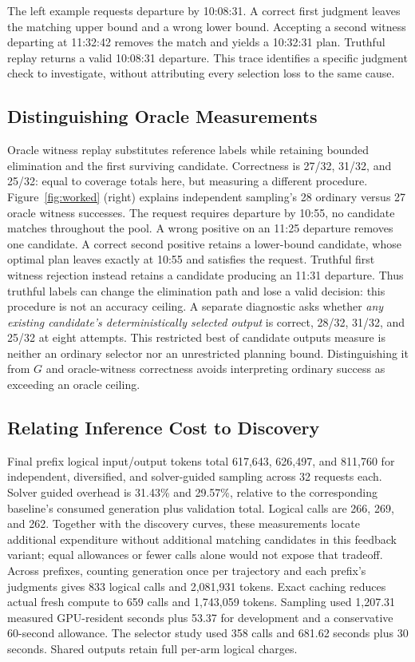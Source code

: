 \documentclass[a4paper,twoside]{article}
\begin{document}
The left example requests departure by 10:08:31. A correct first judgment leaves the matching upper bound and a wrong lower bound. Accepting a second witness departing at 11:32:42 removes the match and yields a 10:32:31 plan. Truthful replay returns a valid 10:08:31 departure. This trace identifies a specific judgment check to investigate, without attributing every selection loss to the same cause.

\subsection{Distinguishing Oracle Measurements}

Oracle witness replay substitutes reference labels while retaining bounded elimination and the first surviving candidate. Correctness is 27/32, 31/32, and 25/32: equal to coverage totals here, but measuring a different procedure.
Figure~\ref{fig:worked} (right) explains independent sampling's 28 ordinary versus 27 oracle witness successes. The request requires departure by 10:55, no candidate matches throughout the pool. A wrong positive on an 11:25 departure removes one candidate. A correct second positive retains a lower-bound candidate, whose optimal plan leaves exactly at 10:55 and satisfies the request. Truthful first witness rejection instead retains a candidate producing an 11:31 departure. Thus truthful labels can change the elimination path and lose a valid decision: this procedure is not an accuracy ceiling.
A separate diagnostic asks whether \emph{any existing candidate's deterministically selected output} is correct,  28/32, 31/32, and 25/32 at eight attempts. This restricted best of candidate outputs measure is neither an ordinary selector nor an unrestricted planning bound. Distinguishing it from $G$ and oracle-witness correctness avoids interpreting ordinary success as exceeding an oracle ceiling.

\subsection{Relating Inference Cost to Discovery}

Final prefix logical input/output tokens total 617,643, 626,497, and 811,760 for independent, diversified, and solver-guided sampling across 32 requests each. Solver guided overhead is 31.43\% and 29.57\%, relative to the corresponding baseline's consumed generation plus validation total. Logical calls are 266, 269, and 262. Together with the discovery curves, these measurements locate additional expenditure without additional matching candidates in this feedback variant; equal allowances or fewer calls alone would not expose that tradeoff.
Across prefixes, counting generation once per trajectory and each prefix's judgments gives 833 logical calls and 2,081,931 tokens. Exact caching reduces actual fresh compute to 659 calls and 1,743,059 tokens. Sampling used 1,207.31 measured GPU-resident seconds plus 53.37 for development and a conservative 60-second allowance. The selector study used 358 calls and 681.62 seconds plus 30 seconds. Shared outputs retain full per-arm logical charges.
\end{document}
